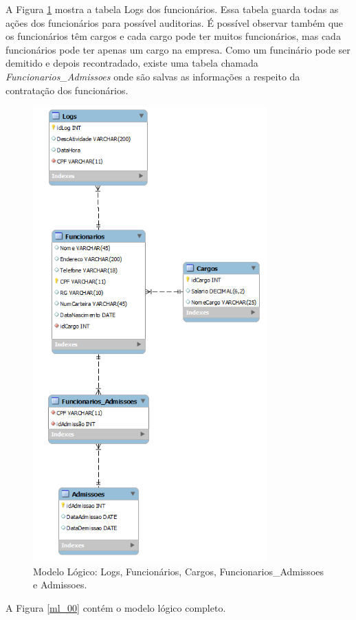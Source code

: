 \documentclass[
	12pt,				%
	openright,			%
	oneside,			%
	a4paper,			%
	chapter=TITLE,		%
	section=TITLE,		%
	english,			%
	brazil				%
	]{abntex2}
\begin{document}
    A Figura \ref{ml_03} mostra a tabela Logs dos funcionários. Essa tabela guarda todas as ações dos 
    funcionários para possível auditorias. É possível observar também que os funcionários têm cargos e 
    cada cargo pode ter muitos funcionários, mas cada funcionários pode ter apenas um cargo na empresa. 
    Como um funcinário pode ser demitido e depois recontradado, existe uma tabela chamada 
    \textit{Funcionarios\_Admissoes} onde são salvas as informações a respeito da contratação dos 
    funcionários.
    \begin{figure}[h]
         \centering
         \includegraphics[width=9cm,keepaspectratio]{Imgs/ML_03}
         \caption{Modelo Lógico: Logs, Funcionários, Cargos, Funcionarios\_Admissoes e Admissoes.}
         \label{ml_03}
    \end{figure}
    
    \newpage
    
    A Figura \ref{ml_00} contém o modelo lógico completo.
    
\end{document}

